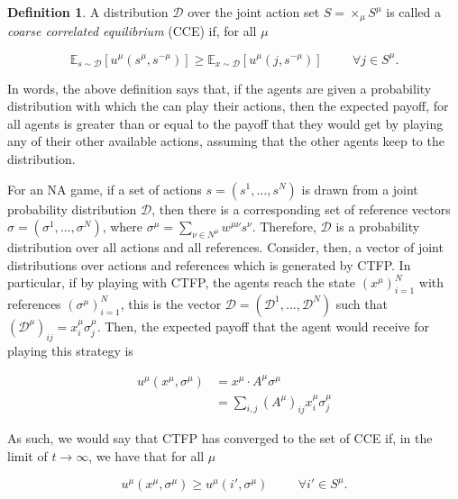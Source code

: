 \documentclass{article}
\theoremstyle{definition}
\newtheorem*{definition}{Definition}
\newcommand{\wmunu}{w^{\mu \nu}}
\newcommand{\xmu}{x^{\mu}}
\newcommand{\refmu}{\sigma^{\mu}}
\begin{document}
	\begin{definition}
		A distribution $\mathcal{D}$ over the joint action set $S = \times_\mu S^\mu$ is
		called a \emph{coarse correlated equilibrium} (CCE) if, for all $\mu$

		\begin{equation}
			\mathbb{E}_{s \sim \mathcal{D}}[u^\mu (s^\mu, s^{- \mu})] \geq \mathbb{E}_{x \sim \mathcal{D}}[u^\mu (j, s^{- \mu})] \hspace{1cm} \forall j \in S^\mu.
		\end{equation}
	\end{definition}

	In words, the above definition says that, if the agents are given a probability distribution
	with which the can play their actions, then the expected payoff, for all agents is greater than
	or equal to the payoff that they would get by playing any of their other available actions,
	assuming that the other agents keep to the distribution. 
	
	For an NA game, if a set of actions $s = (s^1, \ldots, s^N)$ is drawn from a joint probability
	distribution $\mathcal{D}$, then there is a corresponding set of reference vectors $\sigma =
	(\sigma^1, \ldots, \sigma^N)$, where $\sigma^\mu = \sum_{\nu \in N^\mu} \wmunu s^\nu$.
	Therefore, $\mathcal{D}$ is a probability distribution over all actions and all references.
	Consider, then, a vector of joint distributions over actions and references which is generated
	by CTFP. In particular, if by playing with CTFP, the agents reach the state $(\xmu)_{i = 1}^N$
	with references $(\refmu)_{i = 1}^N$, this is the vector $\mathcal{D} = (\mathcal{D}^1, ...,
	\mathcal{D}^N)$ such that $(\mathcal{D}^\mu)_{ij} = \xmu_i \refmu_j$. Then, the expected payoff
	that the agent would receive for playing this strategy is 

	\begin{align}
		u^\mu(\xmu, \refmu) & = \xmu \cdot A^\mu \refmu \nonumber \\
		& = \sum_{i, j} (A^\mu)_{ij} \xmu_i \refmu_j \nonumber 
	\end{align}

	As such, we would say that CTFP has converged to the set of CCE if, in the limit of $t
	\rightarrow \infty$, we have that for all $\mu$

	\begin{equation}
		u^\mu (\xmu, \refmu) \geq u^\mu(i', \refmu) \hspace{1cm} \forall i' \in S^\mu.
	\end{equation}
\end{document}

